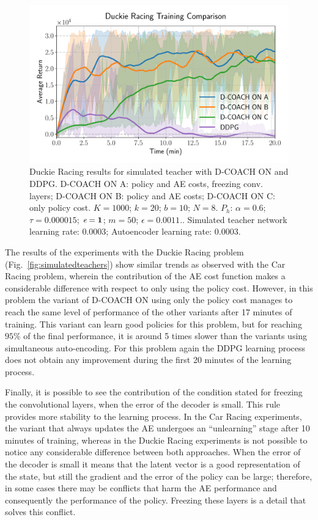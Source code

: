 \begin{figure}[h]
    \centering
    \includegraphics[width=0.8\linewidth]{imagenes/cap3/duckie_sim_ICRA.pdf}
    \caption{Duckie Racing results for simulated teacher with D-COACH ON and DDPG. D-COACH ON A: policy and AE costs, freezing conv. layers; D-COACH ON B: policy and AE costs; D-COACH ON C: only policy cost. $K = 1000$; $k=20$; $b = 10$; $N = 8$. $P_{h}$: $\alpha = 0.6$; $\tau = 0.000015$; $\emph{e}=\textbf{1}$; $m=50$; $\epsilon=0.0011$.. Simulated teacher network learning rate: $0.0003$; Autoencoder learning rate: $0.0003$.}
    \label{fig:racing_car_results}
\end{figure}

The results of the experiments with the Duckie Racing problem (Fig.~\ref{fig:simulatedteachers}) show similar trends as observed with the Car Racing problem, wherein the contribution of the AE cost function makes a considerable difference with respect to only using the policy cost. However, in this problem the variant of D-COACH ON using only the policy cost manages to reach the same level of performance of the other variants after 17 minutes of training. This variant can learn good policies for this problem, but for reaching $95\%$ of the final performance, it is around 5 times slower than the variants using simultaneous auto-encoding. For this problem again the DDPG learning process does not obtain any improvement during the first 20 minutes of the learning process. 

Finally, it is possible to see the contribution of the condition stated for freezing the convolutional layers, when the error of the decoder is small. This rule provides more stability to the learning process. In the Car Racing experiments, the variant that always updates the AE undergoes an ``unlearning'' stage after 10 minutes of training, whereas in the Duckie Racing experiments is not possible to notice any considerable difference between both approaches. When the error of the decoder is small it means that the latent vector is a good representation of the state, but still the gradient and the error of the policy can be large; therefore, in some cases there may be conflicts that harm the AE performance and consequently the performance of the policy. Freezing these layers is a detail that solves this conflict.

